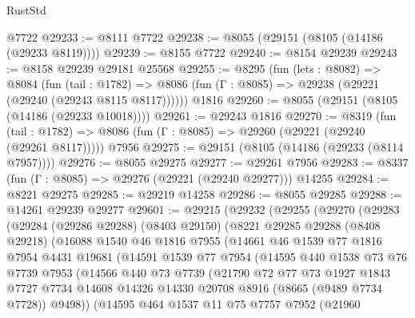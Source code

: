 \begin{lexlean}{RustStd}
\begin{coremodule}
    @7722
@29233 := @8111 @7722
@29238 := @8055 (@29151 (@8105 (@14186 (@29233 @8119))))
@29239 := @8155 @7722
@29240 := @8154 @29239
@29243 := @8158 @29239 @29181 @25568
@29255 := @8295
    (fun (lets : @8082) =>
    @8084
      (fun (tail : @1782) =>
      @8086 (fun (Γ : @8085) => @29238 (@29221 (@29240 (@29243 @8115 @8117))))))
    @1816
@29260 := @8055 (@29151 (@8105 (@14186 (@29233 @10018))))
@29261 := @29243 @1816
@29270 := @8319
    (fun (tail : @1782) => @8086 (fun (Γ : @8085) => @29260 (@29221 (@29240 (@29261 @8117)))))
    @7956
@29275 := @29151 (@8105 (@14186 (@29233 (@8114 @7957))))
@29276 := @8055 @29275
@29277 := @29261 @7956
@29283 := @8337 (fun (Γ : @8085) => @29276 (@29221 (@29240 @29277))) @14255
@29284 := @8221 @29275
@29285 := @29219 @14258
@29286 := @8055 @29285
@29288 := @14261 @29239 @29277
@29601 := @29215
    (@29232
      (@29255
        (@29270
          (@29283
            (@29284
              (@29286 @29288)
              (@8403 @29150)
              (@8221
                @29285
                @29288
                (@8408 @29218)
                (@16088
                  @1540
                  @46
                  @1816
                  @7955
                  (@14661
                    @46
                    @1539
                    @77
                    @1816
                    @7954
                    @4431
                    @19681
                    (@14591
                      @1539
                      @77
                      @7954
                      (@14595
                        @440
                        @1538
                        @73
                        @76
                        @7739
                        @7953
                        (@14566
                          @440
                          @73
                          @7739
                          (@21790
                            @72
                            @77
                            @73
                            @1927
                            @1843
                            @7727
                            @7734
                            @14608
                            @14326
                            @14330
                            @20708
                            @8916
                            (@8665 (@9489 @7734 @7728))
                            @9498))
                        (@14595
                          @464
                          @1537
                          @11
                          @75
                          @7757
                          @7952
                          (@21960

\end{coremodule}
\end{lexlean}
